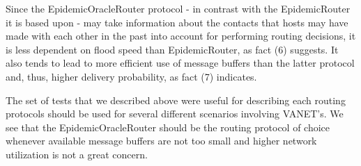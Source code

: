 Since the EpidemicOracleRouter protocol - in contrast with the EpidemicRouter
it is based upon - may take information about the contacts that hosts may have
made with each other in the past into account for performing routing decisions,
it is less dependent on flood speed than EpidemicRouter, as fact (6) suggests.
It also tends to lead to more efficient use of message buffers than the latter
protocol and, thus, higher delivery probability, as fact (7) indicates.

The set of tests that we described above were useful for describing each
routing protocols should be used for several different scenarios involving
VANET's. We see that the EpidemicOracleRouter should be the routing
protocol of choice whenever available message buffers are not too small and
higher network utilization is not a great concern.
